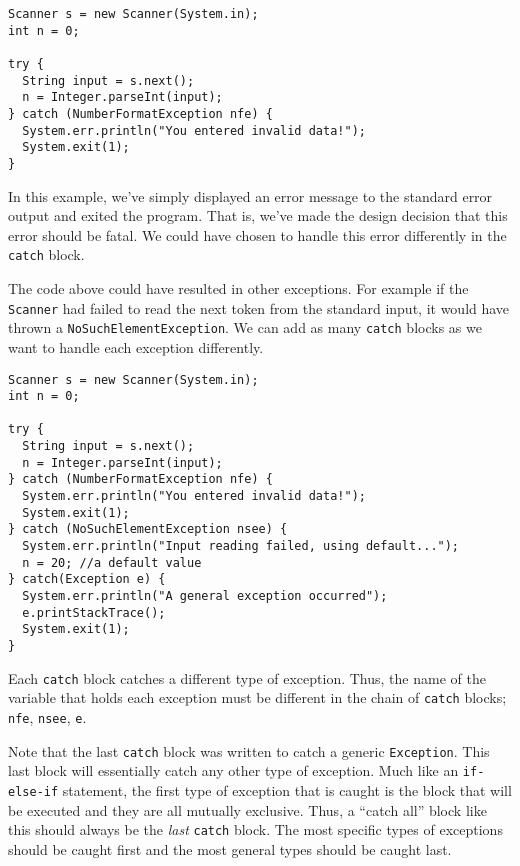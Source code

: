 \begin{verbatim}
Scanner s = new Scanner(System.in);
int n = 0;
		
try {
  String input = s.next();
  n = Integer.parseInt(input);
} catch (NumberFormatException nfe) {
  System.err.println("You entered invalid data!");
  System.exit(1);
}
\end{verbatim}

In this example, we've simply displayed an error message to
the standard error output and exited the program.  That is, 
we've made the design decision that this error should be fatal.
We could have chosen to handle this error differently in the
\texttt{catch} block.

The code above could have resulted in other exceptions.  For
example if the \texttt{Scanner} had failed to read the
next token from the standard input, it would have thrown a
\texttt{NoSuchElementException}.  We can add
as many \texttt{catch} blocks as we want to handle
each exception differently.

\begin{verbatim}
Scanner s = new Scanner(System.in);
int n = 0;
		
try {
  String input = s.next();
  n = Integer.parseInt(input);
} catch (NumberFormatException nfe) {
  System.err.println("You entered invalid data!");
  System.exit(1);
} catch (NoSuchElementException nsee) {
  System.err.println("Input reading failed, using default...");
  n = 20; //a default value
} catch(Exception e) {
  System.err.println("A general exception occurred");
  e.printStackTrace();
  System.exit(1);
}
\end{verbatim}

Each \texttt{catch} block catches a different 
type of exception.  Thus, the name of the variable
that holds each exception must be different in the chain
of \texttt{catch} blocks; \texttt{nfe}, 
\texttt{nsee}, \texttt{e}.

Note that the last \texttt{catch} block was written
to catch a generic \texttt{Exception}.  This last
block will essentially catch any other type of exception.  
Much like an \texttt{if-else-if} statement, the
first type of exception that is caught is the block that will
be executed and they are all mutually exclusive.  Thus, a
``catch all'' block like this should always be the \emph{last} 
\texttt{catch} block.  The most specific types
of exceptions should be caught first and the most general
types should be caught last.


